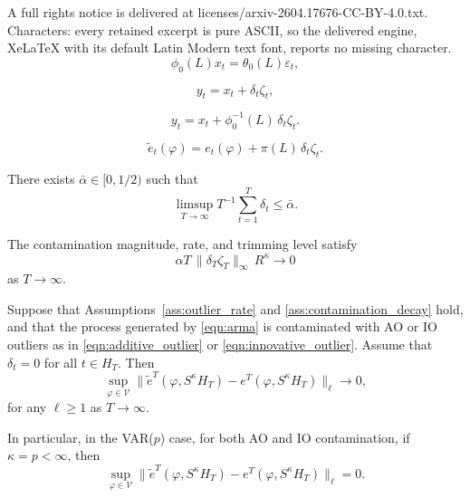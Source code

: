 \documentclass[10pt,a4paper]{amsart}
\begin{document}
A full rights notice is delivered at licenses/arxiv-2604.17676-CC-BY-4.0.txt. Characters: every retained excerpt is pure ASCII, so the delivered engine, XeLaTeX with its default Latin Modern text font, reports no missing character.
\begin{equation} \label{eqn:arma}
\phi_0(L) x_t = \theta_0(L) \varepsilon_t,
\end{equation}

\begin{equation} \label{eqn:additive_outlier}
y_t = x_t + \delta_t \zeta_t,
\end{equation}

\begin{equation} \label{eqn:innovative_outlier}
y_t = x_t + \phi_0^{-1}(L)\,\delta_t \zeta_t.
\end{equation}

\begin{equation}\label{residualao_general}
\tilde e_t(\varphi)
=
e_t(\varphi)
+
\pi(L)\,\delta_t \zeta_t .
\end{equation}

\begin{assumption}\label{ass:outlier_rate}
There exists $\bar{\alpha} \in [0,1/2)$ such that
\begin{equation}
\limsup_{T\to\infty} T^{-1}\sum_{t=1}^T \delta_t \le \bar{\alpha}.
\end{equation}
\end{assumption}

\begin{assumption}\label{ass:contamination_decay}
The contamination magnitude, rate, and trimming level satisfy
\begin{equation}\label{eqn:kappa-condition}
\alpha T \,\|\delta_T \zeta_T\|_\infty \, R^\kappa \longrightarrow 0
\end{equation}
as $T \to \infty$.
\end{assumption}

\begin{lemma}\label{lem:residualconv_uniform}
Suppose that Assumptions~\ref{ass:outlier_rate} and \ref{ass:contamination_decay} hold, and that the process generated by \eqref{eqn:arma} is contaminated with AO or IO outliers as in \eqref{eqn:additive_outlier} or \eqref{eqn:innovative_outlier}.
Assume that
$\delta_t = 0$ for all $t \in H_T$.
Then
\begin{equation}\label{eq:evectorconvergence}
\sup_{\varphi \in \mathcal V}
\|\tilde{e}^T(\varphi, S^\kappa H_T)-e^T(\varphi, S^\kappa H_T)\|_\ell
\longrightarrow 0,
\end{equation}
for any $\ell \ge 1$ as $T\to\infty$.

In particular, in the VAR($p$) case, for both AO and IO contamination, if $\kappa = p < \infty$, then
\begin{equation}
\sup_{\varphi \in \mathcal V}
\|\tilde{e}^T(\varphi, S^\kappa H_T)-e^T(\varphi, S^\kappa H_T)\|_\ell
= 0.
\end{equation}
\end{lemma}
\end{document}
